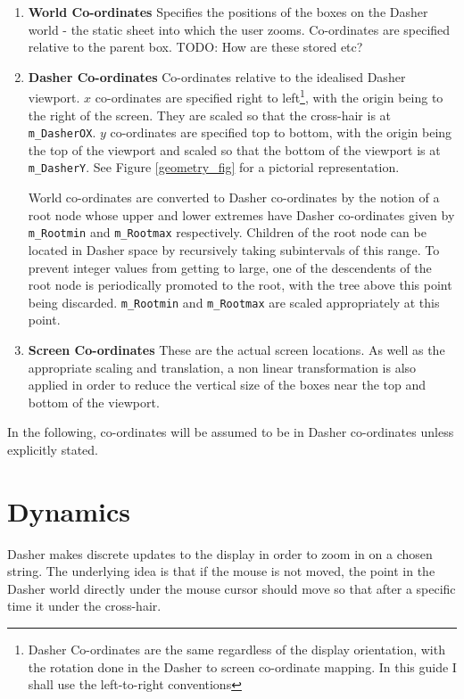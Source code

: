 \documentclass{article}
\begin{document}
\begin{enumerate}
\item {\bf World Co-ordinates} Specifies the positions of the boxes on the Dasher world - the static sheet into which the user zooms. Co-ordinates are specified relative to the parent box. TODO: How are these stored etc?
\item {\bf Dasher Co-ordinates} Co-ordinates relative to the idealised Dasher viewport. $x$ co-ordinates are specified right to left\footnote{Dasher Co-ordinates are the same regardless of the display orientation, with the rotation done in the Dasher to screen co-ordinate mapping. In this guide I shall use the left-to-right conventions}, with the origin being to the right of the screen. They are scaled so that the cross-hair is at {\tt m\_DasherOX}. $y$ co-ordinates are specified top to bottom, with the origin being the top of the viewport and scaled so that the bottom of the viewport is at {\tt m\_DasherY}. See Figure \ref{geometry_fig} for a pictorial representation.

World co-ordinates are converted to Dasher co-ordinates by the notion of a root node whose upper and lower extremes have Dasher co-ordinates given by {\tt m\_Rootmin} and {\tt m\_Rootmax} respectively. Children of the root node can be located in Dasher space by recursively taking subintervals of this range. To prevent integer values from getting to large, one of the descendents of the root node is periodically promoted to the root, with the tree above this point being discarded. {\tt m\_Rootmin} and {\tt m\_Rootmax} are scaled appropriately at this point.

\item {\bf Screen Co-ordinates} These are the actual screen locations. As well as the appropriate scaling and translation, a non linear transformation is also applied in order to reduce the vertical size of the boxes near the top and bottom of the viewport.

\end{enumerate}

In the following, co-ordinates will be assumed to be in Dasher co-ordinates unless explicitly stated.

\section{Dynamics}

Dasher makes discrete updates to the display in order to zoom in on a chosen string. The underlying idea is that if the mouse is not moved, the point in the Dasher world directly under the mouse cursor should move so that after a specific time it under the cross-hair. 
\end{document}
